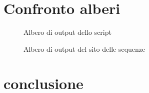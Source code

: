 \documentclass[11pt,italian]{article}
\begin{document}
\section{Confronto alberi}
\begin{figure}[H]
  \caption{Albero di output dello script}
  \label{fig:jalview-end}
\end{figure}
\begin{figure}[H]
  \caption{Albero di output del sito delle sequenze}
  \label{fig:jalview-end}
\end{figure}

\section{conclusione}
\end{document}
